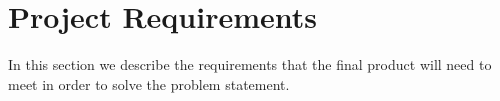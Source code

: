 \section{Project Requirements} \label{Requirements}
In this section we describe the requirements that the final product will need to meet in order to solve the problem statement.%



